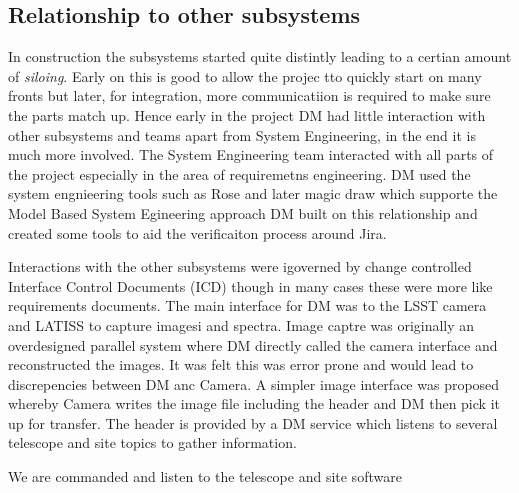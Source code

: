 \subsection{Relationship to other subsystems}
In construction the subsystems started quite distintly leading to a certian amount of \emph{siloing}.
Early on this is good to allow the projec tto quickly start on many fronts but later, for integration, more communicatiion is required to make sure the parts match up.
Hence early in the project DM had little interaction with other subsystems and teams apart from System Engineering, in the end it is much more involved.
The System Engineering team interacted with all parts of the project especially in the area of requiremetns engineering.
DM used the system engnieering tools such as Rose and later magic draw which supporte the Model Based System Egineering approach \cite{2014SPIE.9150E..0MC}
DM built on this relationship and created some tools to aid the verificaiton process around Jira.

Interactions with the other subsystems were igoverned by change controlled  Interface Control Documents (ICD) though in many cases these were more like requirements documents.
The main interface for DM was to the LSST camera \citep{2010SPIE.7735E..0JK} and LATISS \citep{2020SPIE11452E..0UI} to capture imagesi and spectra.
Image captre was originally an overdesigned parallel system where DM directly called the camera interface and reconstructed the images.
It was felt this was error prone and would lead to discrepencies between DM anc Camera.
A simpler image interface was proposed \citep{DMTN-143}  whereby Camera writes the image file including the header and DM then pick it up for transfer.
The header is provided by a DM service which listens to several telescope and site topics to gather information.

We are commanded and listen to the telescope  and site software  \citep{2022SPIE12182E..0WT}



